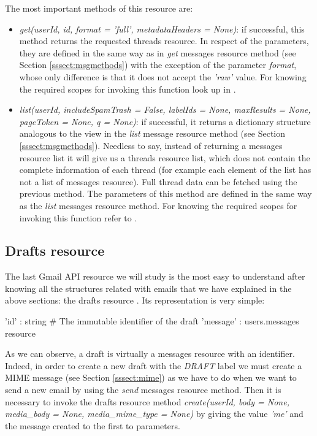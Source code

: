 The most important methods of this resource are:
\begin{itemize}
	\item\textit{get(userId, id, format = 'full', metadataHeaders = None)}: if successful, this method returns the requested threads resource. In respect of the parameters, they are defined in the same way as in \textit{get} messages resource method (see Section \ref{sssect:msgmethods}) with the exception of the parameter \textit{format}, whose only difference is that it does not accept the \textit{'raw'} value. For knowing the required scopes for invoking this function look up in \cite[/v1/reference/users/threads/get]{gmailAPI}.
	\item\textit{list(userId, includeSpamTrash = False, labelIds = None, maxResults = None, pageToken = None, q = None)}: if successful, it returns a dictionary structure analogous to the view in the \textit{list} message resource method (see Section \ref{sssect:msgmethods}). Needless to say, instead of returning a messages resource list it will give us a threads resource list, which does not contain the complete information of each thread (for example each element of the list has not a list of messages resource). Full thread data can be fetched using the previous method. The parameters of this method are defined in the same way as the \textit{list} messages resource method. For knowing the required scopes for invoking this function refer to \cite[/v1/reference/users/threads/list]{gmailAPI}.
\end{itemize}

\subsection{Drafts resource}\label{ssect:drafts}
The last Gmail API resource we will study is the most easy to understand after knowing all the structures related with emails that we have explained in the above sections: the drafts resource \citep[/v1/reference/users/drafts]{gmailAPI}. Its representation is very simple:

\begin{python}
	{
		'id' : string # The immutable identifier of the draft
		'message' : users.messages resource
	}
\end{python}

As we can observe, a draft is virtually a messages resource with an identifier. Indeed, in order to create a new draft with the \textit{DRAFT} label we must create a MIME message (see Section \ref{sssect:mime}) as we have to do when we want to send a new email by using the \textit{send} messages resource method. Then it is necessary to invoke the drafts resource method \textit{create(userId, body = None, media\_body = None, media\_mime\_type = None)} by giving the value \textit{'me'} and the message created to the first to parameters.

